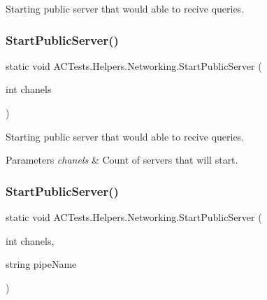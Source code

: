 Starting public server that would able to recive queries. 

\mbox{\label{class_a_c_tests_1_1_helpers_1_1_networking_a1f28547270cfee57670d6f80842434d3}} 
\subsubsection{\texorpdfstring{Start\+Public\+Server()}{StartPublicServer()}\hspace{0.1cm}{\footnotesize\ttfamily [2/3]}}
{\footnotesize\ttfamily static void A\+C\+Tests.\+Helpers.\+Networking.\+Start\+Public\+Server (\begin{DoxyParamCaption}\item[{int}]{chanels }\end{DoxyParamCaption})\hspace{0.3cm}{\ttfamily [static]}}



Starting public server that would able to recive queries. 


\begin{DoxyParams}{Parameters}
{\em chanels} & Count of servers that will start.\\
\hline
\end{DoxyParams}
\mbox{\label{class_a_c_tests_1_1_helpers_1_1_networking_a29d847bed88e1eec30f2022b6af17e64}} 
\subsubsection{\texorpdfstring{Start\+Public\+Server()}{StartPublicServer()}\hspace{0.1cm}{\footnotesize\ttfamily [3/3]}}
{\footnotesize\ttfamily static void A\+C\+Tests.\+Helpers.\+Networking.\+Start\+Public\+Server (\begin{DoxyParamCaption}\item[{int}]{chanels,  }\item[{string}]{pipe\+Name }\end{DoxyParamCaption})\hspace{0.3cm}{\ttfamily [static]}}



